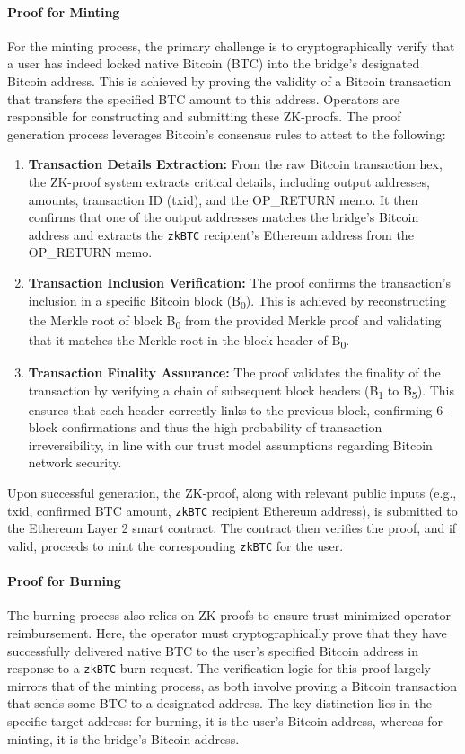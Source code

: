 \documentclass{DESSThesis}
\newcommand{\zktoken}{\texttt{zkBTC}}
\begin{document}
\paragraph{Proof for Minting}
For the minting process, the primary challenge is to cryptographically verify that a user has indeed locked native Bitcoin (BTC) into the bridge's designated Bitcoin address. This is achieved by proving the validity of a Bitcoin transaction that transfers the specified BTC amount to this address. Operators are responsible for constructing and submitting these ZK-proofs. The proof generation process leverages Bitcoin's consensus rules to attest to the following:
\begin{enumerate}
    \item \textbf{Transaction Details Extraction:} From the raw Bitcoin transaction hex, the ZK-proof system extracts critical details, including output addresses, amounts, transaction ID (txid), and the OP\_RETURN memo. It then confirms that one of the output addresses matches the bridge's Bitcoin address and extracts the \texttt{\zktoken} recipient's Ethereum address from the OP\_RETURN memo.
    \item \textbf{Transaction Inclusion Verification:} The proof confirms the transaction's inclusion in a specific Bitcoin block (B\textsubscript{0}). This is achieved by reconstructing the Merkle root of block B\textsubscript{0} from the provided Merkle proof and validating that it matches the Merkle root in the block header of B\textsubscript{0}.
    \item \textbf{Transaction Finality Assurance:} The proof validates the finality of the transaction by verifying a chain of subsequent block headers (B\textsubscript{1} to B\textsubscript{5}). This ensures that each header correctly links to the previous block, confirming 6-block confirmations and thus the high probability of transaction irreversibility, in line with our trust model assumptions regarding Bitcoin network security.
\end{enumerate}
Upon successful generation, the ZK-proof, along with relevant public inputs (e.g., txid, confirmed BTC amount, \texttt{\zktoken} recipient Ethereum address), is submitted to the Ethereum Layer 2 smart contract. The contract then verifies the proof, and if valid, proceeds to mint the corresponding \texttt{\zktoken} for the user.

\paragraph{Proof for Burning}
The burning process also relies on ZK-proofs to ensure trust-minimized operator reimbursement. Here, the operator must cryptographically prove that they have successfully delivered native BTC to the user's specified Bitcoin address in response to a \texttt{\zktoken} burn request. The verification logic for this proof largely mirrors that of the minting process, as both involve proving a Bitcoin transaction that sends some BTC to a designated address. The key distinction lies in the specific target address: for burning, it is the user's Bitcoin address, whereas for minting, it is the bridge's Bitcoin address.
\end{document}
